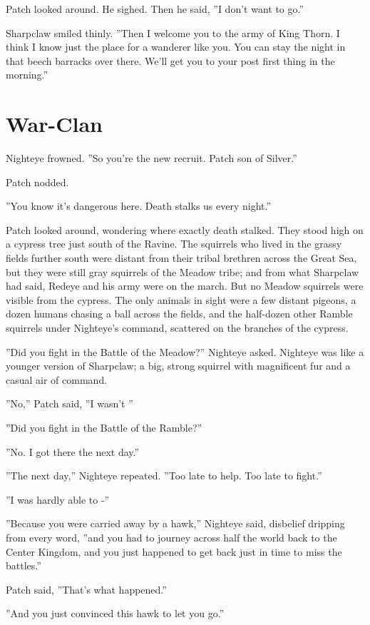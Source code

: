 \documentclass[12pt]{book}
\begin{document}
Patch looked around. He sighed. Then he said, ''I don't want to go.''

Sharpclaw smiled thinly. ''Then I welcome you to the army of King Thorn. I think I know just the place for a wanderer like you. You can stay the night in that beech barracks over there. We'll get you to your post first thing in the morning.''


\section{War-Clan}

Nighteye frowned. ''So you're the new recruit. Patch son of Silver.''

Patch nodded.

''You know it's dangerous here. Death stalks us every night.''

Patch looked around, wondering where exactly death stalked. They stood high on a cypress tree just south of the Ravine. The squirrels who lived in the grassy fields further south were distant from their tribal brethren across the Great Sea, but they were still gray squirrels of the Meadow tribe; and from what Sharpclaw had said, Redeye and his army were on the march. But no Meadow squirrels were visible from the cypress. The only animals in sight were a few distant pigeons, a dozen humans chasing a ball across the fields, and the half-dozen other Ramble squirrels under Nighteye's command, scattered on the branches of the cypress.

''Did you fight in the Battle of the Meadow?'' Nighteye asked. Nighteye was like a younger version of Sharpclaw; a big, strong squirrel with magnificent fur and a casual air of command.

''No,'' Patch said, ''I wasn't %
''

''Did you fight in the Battle of the Ramble?''

''No. I got there the next day.''

''The next day,'' Nighteye repeated. ''Too late to help. Too late to fight.''

''I was hardly able to -''

''Because you were carried away by a hawk,'' Nighteye said, disbelief dripping from every word, ''and you had to journey across half the world back to the Center Kingdom, and you just happened to get back just in time to miss the battles.''

Patch said, ''That's what happened.''

''And you just convinced this hawk to let you go.''
\end{document}
